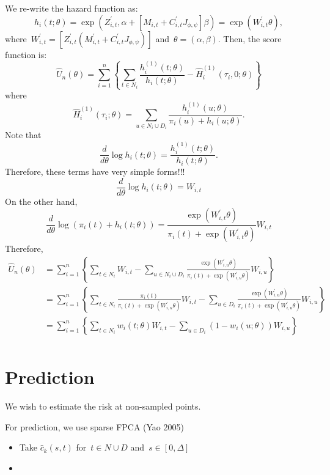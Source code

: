 \documentclass[11pt]{amsart}
\begin{document}
We re-write the hazard function as:
\[
h_i (t; \theta) = \exp \left( Z_{i,t}^\prime, \alpha + [M_{i,t} + C_{i,t}^\prime
  J_{\phi, \psi} ] \beta \right) = \exp \left( W_{i,t}^\prime \theta \right),
\]
where~$W_{i,t}^\prime = [ Z_{i,t}^\prime (M_{i,t}^\prime +
C_{i,t}^\prime J_{\phi, \psi}) ]$ and~$\theta = (\alpha,
\beta)$. Then, the score function is:
\[
\hat U_n (\theta) = \sum_{i=1}^n \left \{  \sum_{t \in N_i}
  \frac{h_i^{(1)} (t; \theta)}{h_i (t; \theta)} - \hat H_i^{(1)}
  (\tau_i, 0; \theta) 
\right \}
\]
where
\[
\hat H_i^{(1)} (\tau_i; \theta) = \sum_{u \in N_i \cup D_i} \frac{
  h^{(1)}_i (u; \theta)}{\pi_i (u) + h_i (u; \theta)}.
\]
Note that
\[
\frac{d}{d\theta} \log h_i (t; \theta) = \frac{h^{(1)}_i (t;
  \theta)}{h_i (t; \theta)}.
\]
Therefore, these terms have very simple forms!!! 
\[
\frac{d}{d\theta} \log h_i (t; \theta) = W_{i,t}
\]
On the other hand,
\[
\frac{d}{d \theta} \log \left( \pi_i (t) + h_i (t;\theta) \right) = 
\frac{\exp \left( W_{i,t}^\prime \theta \right)}{\pi_i (t) + \exp
  \left( W_{i,t}^\prime \theta \right)} W_{i,t}
\]
Therefore,
\begin{align*}
\hat U_n (\theta) 
  &= \sum_{i=1}^n \left \{ \sum_{t \in N_i} W_{i,t} -
    \sum_{u \in N_i \cup D_i} \frac{\exp \left( W_{i,u}^\prime \theta
    \right)}{\pi_i (t) + \exp \left( W_{i,u}^\prime \theta \right)}
    W_{i,u} \right \} \\
  &= \sum_{i=1}^n \left \{ \sum_{t \in N_i} \frac{\pi_i (t)}{\pi_i (t)
    + \exp \left( W_{i,u}^\prime \theta \right)} W_{i,t} -
    \sum_{u \in D_i} \frac{\exp \left( W_{i,u}^\prime \theta
    \right)}{\pi_i (t) + \exp \left( W_{i,u}^\prime \theta \right)}
    W_{i,u} \right \} \\
  &= \sum_{i=1}^n \left \{ \sum_{t \in N_i} w_{i} (t; \theta) W_{i,t} -
    \sum_{u \in D_i} (1 - w_i (u; \theta)) W_{i,u} \right \} \\
\end{align*}


\section{Prediction}
We wish to estimate the risk at non-sampled points.

For prediction, we use sparse FPCA (Yao 2005) 
\begin{itemize}
\item Take $\hat c_{k} (s,t)$ for~$t \in N \cup D$ and~$s \in
  [0,\Delta]$
\item 
\end{itemize}
\end{document}
